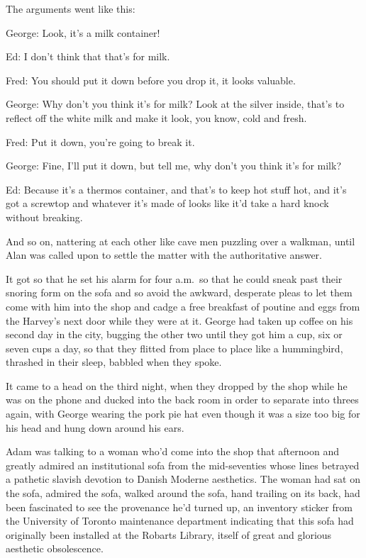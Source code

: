 The arguments went like this:

George:  Look, it's a milk container!

Ed:  I don't think that that's for milk.

Fred:  You should put it down before you drop it, it looks valuable.

George:  Why don't you think it's for milk?  Look at the silver
inside, that's to reflect off the white milk and make it look, you
know, cold and fresh.

Fred:  Put it down, you're going to break it.

George:  Fine, I'll put it down, but tell me, why don't you think it's
for milk?

Ed:  Because it's a thermos container, and that's to keep hot stuff
hot, and it's got a screwtop and whatever it's made of looks like it'd
take a hard knock without breaking.

And so on, nattering at each other like cave men puzzling over a
walkman, until Alan was called upon to settle the matter with the
authoritative answer.

It got so that he set his alarm for four a.m.\  so that he could sneak
past their snoring form on the sofa and so avoid the awkward,
desperate pleas to let them come with him into the shop and cadge a
free breakfast of poutine and eggs from the Harvey's next door while
they were at it.  George had taken up coffee on his second day in the
city, bugging the other two until they got him a cup, six or seven
cups a day, so that they flitted from place to place like a
hummingbird, thrashed in their sleep, babbled when they spoke.

It came to a head on the third night, when they dropped by the shop
while he was on the phone and ducked into the back room in order to
separate into threes again, with George wearing the pork pie hat even
though it was a size too big for his head and hung down around his
ears.

Adam was talking to a woman who'd come into the shop that afternoon
and greatly admired an institutional sofa from the mid-seventies whose
lines betrayed a pathetic slavish devotion to Danish Moderne
aesthetics.  The woman had sat on the sofa, admired the sofa, walked
around the sofa, hand trailing on its back, had been fascinated to see
the provenance he'd turned up, an inventory sticker from the
University of Toronto maintenance department indicating that this sofa
had originally been installed at the Robarts Library, itself of great
and glorious aesthetic obsolescence.


